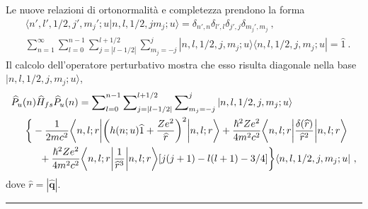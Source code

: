 \documentclass[12pt,a4paper]{report}
\numberwithin{equation}{section}
\numberwithin{section}{chapter}
\begin{document}
	Le nuove relazioni di ortonormalit\`a e completezza prendono la forma
	\begin{subequations}
		\begin{align}
		&\langle n',l',1/2,j',{m_j}';u|n,l,1/2,jm_j;u\rangle = \delta_{n',n}\delta_{l',l}\delta_{j',j}\delta_{{m_j}',m_j}~,\label{appteo6:first}\\
		&\sum\nolimits_{n=1}^{\infty}\sum\nolimits_{l=0}^{n-1}\sum\nolimits_{j=|l-1/2|}^{l+1/2}\sum\nolimits_{m_j=-j}^j|n,l,1/2,j,m_j;u\rangle\langle n,l,1/2,j,m_j;u| = \widehat{1}~.\label{appteo6:second}
		\end{align}
	\end{subequations}
	Il calcolo dell'operatore perturbativo mostra che esso risulta diagonale nella base\\\noindent$|n,l,1/2,j,m_j;u\rangle$,
	\begin{align}
	\label{appteo7}
	&\widehat{P}_u(n)\widehat{H}_{fs}\widehat{P}_u(n) = \sum\nolimits_{l=0}^{n-1}\sum\nolimits_{j=|l-1/2|}^{l+1/2}\sum\nolimits_{m_j=-j}^j|n,l,1/2,j,m_j;u\rangle\\
	&\hspace{0.5cm}\bigg\lbrace-\frac{1}{2mc^2}\bigg\langle n,l;r\bigg|\bigg(h(n;u)\widehat{1}+\frac{Ze^2}{\widehat{r}}\bigg)^2\bigg|n,l;r\bigg\rangle + \frac{\hslash^2Ze^2}{4m^2c^2}\bigg\langle n,l;r\bigg|\frac{\delta(\widehat{r})}{\widehat{r}^2}\bigg|n,l;r\bigg\rangle\nonumber\\
	&\hspace{1cm}+ \frac{\hslash^2Ze^2}{4m^2c^2}\bigg\langle n,l;r\bigg|\frac{1}{\widehat{r}^3}\bigg|n,l;r\bigg\rangle[j(j+1) - l(l+1) -3/4]\bigg\rbrace\langle n,l,1/2,j,m_j;u|~,\nonumber
	\end{align}
	dove $\widehat{r} = |\widehat{\boldsymbol{q}}|$.\\
	\rule[0.1cm]{15.8cm}{0.1mm}
\end{document}
